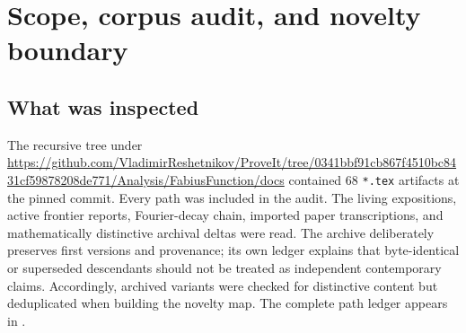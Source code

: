 \documentclass[11pt,oneside]{article}
\numberwithin{equation}{section}
\theoremstyle{plain}
\theoremstyle{definition}
\theoremstyle{remark}
\newcommand{\Up}{\operatorname{up}}
\newcommand{\sinc}{\operatorname{sinc}}
\newcommand{\dd}{\,\mathrm d}
\newcommand{\norm}[1]{\left\lVert#1\right\rVert}
\newcommand{\RepoRoot}{\url{https://github.com/VladimirReshetnikov/ProveIt/tree/0341bbf91cb867f4510bc8431cf59878208de771/Analysis/FabiusFunction/docs}}
\begin{document}
\begin{abstract}
Parseval turns the same norm law into a second, frequency-side geometry.  The pushforward of
$|\Phi(\xi)|^2\dd\xi/\norm{\Up}_2^2$ by $z=(2\pi\xi)^2$ has moments
\[
 m_n=2^{n(n+1)}=q^{-n(n+1)/2},\qquad q=\frac14.
\]
It is therefore an explicit nonclassical representing measure for a shifted
Stieltjes--Wigert moment problem.  A lognormal measure has the same moments but a different
density, proving indeterminacy directly.  We calculate the Hankel determinants, monic
orthogonal polynomials, recurrence coefficients, and Gaussian-$q$-binomial formulae, and
derive the spectral $q$-Pearson law
\[
 w_{\rm sp}(4z)=\frac12\sinc^2(\sqrt z)\,w_{\rm sp}(z).
\]
The report closes with numerical checks, explicit conjectures, a phase-locked confluent
$q$-Richardson program, and a Lean formalization roadmap.  Claims labelled ``new'' are new
relative to the pinned repository corpus after a formula- and terminology-level collision
audit; no universal publication-priority claim is made.
\end{abstract}

\tableofcontents
\newpage

\section{Scope, corpus audit, and novelty boundary}
\label{sec:scope}

\subsection{What was inspected}

The recursive tree under \RepoRoot{} contained $68$ \texttt{*.tex} artifacts at the pinned
commit.  Every path was included in the audit.  The living expositions, active frontier
reports, Fourier-decay chain, imported paper transcriptions, and mathematically distinctive
archival deltas were read.  The archive deliberately preserves first versions and provenance;
its own ledger explains that byte-identical or superseded descendants should not be treated as
independent contemporary claims.  Accordingly, archived variants were checked for distinctive
content but deduplicated when building the novelty map.  The complete path ledger appears in
.
\end{document}
